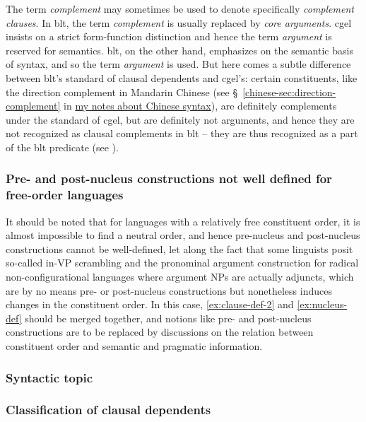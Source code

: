 \documentclass{article}
\newcommand*{\citesec}[1]{\S~{#1}}
\newcommand*{\term}[1]{\emph{#1}}
\newcommand{\chinese}{\href{../Chinese/main.pdf}{my notes about Chinese syntax}}
\begin{document}
The term \term{complement} may sometimes be used to denote specifically \term{complement clauses}. %
In \ac{blt}, the term \term{complement} is usually replaced by \term{core arguments}.
\ac{cgel} insists on a strict form-function distinction 
and hence the term \term{argument} is reserved for semantics.
\ac{blt}, on the other hand, emphasizes on the semantic basis of syntax, 
and so the term \term{argument} is used.
But here comes a subtle difference between \ac{blt}'s standard of clausal dependents and \ac{cgel}'s:
certain constituents, like the direction complement in Mandarin Chinese 
(see \citesec{\ref{chinese-sec:direction-complement}} in \chinese),
are definitely complements under the standard of \ac{cgel},
but are definitely not arguments, 
and hence they are not recognized as clausal complements in \ac{blt}
-- they are thus recognized as a part of the \ac{blt} predicate (see ).

\subsubsection{Pre- and post-nucleus constructions not well defined for free-order languages}\label{sec:free-order-blt}

It should be noted that for languages with a relatively free constituent order,
it is almost impossible to find a neutral order, 
and hence pre-nucleus and post-nucleus constructions 
cannot be well-defined,
let along the fact that some linguists posit so-called in-VP scrambling
and the pronominal argument construction for radical non-configurational languages
where argument NPs are actually adjuncts,
which are by no means pre- or post-nucleus constructions 
but nonetheless induces changes in the constituent order.
In this case, \eqref{ex:clause-def-2} and \eqref{ex:nucleus-def} should be merged together,
and notions like pre- and post-nucleus constructions are to be replaced by 
discussions on the relation between constituent order and semantic and pragmatic information.

\subsubsection{Syntactic topic}

\subsubsection{Classification of clausal dependents}\label{sec:complement-type-necessary}
\end{document}
